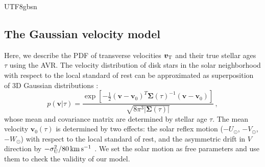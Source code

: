 \documentclass[twocolumn, times, trackchanges]{aastex63_bren}
\newcommand{\mathbfit}{\bm}
\newcommand{\bvT}{\mathbfit{v}_{\rm T}}
\newcommand{\bvzero}{\mathbfit{v}_0}
\begin{document}
\begin{CJK*}{UTF8}{gbsn}
\begin{appendix}
\section{The Gaussian velocity model}
\label{app:velocity model}

Here, we describe the PDF of transverse velocities $\bvT$ and their true stellar ages $\tau$ using the AVR. The velocity distribution of disk stars in the solar neighborhood with respect to the local standard of rest can be approximated as superposition of 3D Gaussian distributions \citep[e.g.,][]{Binney_2008}:
\begin{equation}
\label{eq:3d-gaussian}
    p(\mathbfit{v}|\tau)=\frac{\exp{[-\frac{1}{2}(\mathbfit{v}-\mathbfit{v}_0)^T\mathbf{\Sigma}(\tau)^{-1}(\mathbfit{v}-\mathbfit{v}_0)]}}{\sqrt{8\pi^3|\bm{\Sigma}(\tau)|}}\,,
\end{equation}
whose mean and covariance matrix are determined by stellar age $\tau$. The mean velocity $\bvzero(\tau)$ is determined by two effects: the solar reflex motion ($-U_{\odot}$, $-V_{\odot}$, $-W_{\odot}$) with respect to the local standard of rest, and the asymmetric drift in $V$ direction by $-\sigma_{\rm U}^2/80\rm\,km\,s^{-1}$ \citep[e.g.,][]{Binney_2008}. We set the solar motion as free parameters and use them to check the validity of our model.


\end{appendix}
\end{CJK*}
\end{document}
